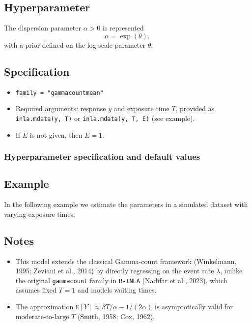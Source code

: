 \documentclass[a4paper,11pt]{article}
\begin{document}
\subsection*{Hyperparameter}

The dispersion parameter $\alpha > 0$ is represented
\begin{displaymath}
    \alpha = \exp(\theta),
\end{displaymath}
with a prior defined on the log-scale parameter $\theta$.

\subsection*{Specification}

\begin{itemize}
\item \texttt{family = "gammacountmean"}
\item Required arguments: response $y$ and exposure time $T$, provided as\\
    \texttt{inla.mdata(y, T)} or 
    \texttt{inla.mdata(y, T, E)} (see example).
\item If $E$ is not given, then $E=1$.
\end{itemize}

\subsubsection*{Hyperparameter specification and default values}


\subsection*{Example}

In the following example we estimate the parameters in a simulated
dataset with varying exposure times.


\subsection*{Notes}

\begin{itemize}
\item This model extends the classical Gamma-count framework
    (Winkelmann, 1995; Zeviani et al., 2014) by directly regressing on
    the event rate $\lambda$, unlike the original \texttt{gammacount}
    family in \texttt{R-INLA} (Nadifar et al., 2023), which assumes
    fixed $T=1$ and models waiting times.
\item The approximation
    ${\texttt E}[Y] \approx \beta T / \alpha - 1/(2\alpha)$ is
    asymptotically valid for moderate-to-large $T$ (Smith, 1958; Cox,
    1962).
\end{itemize}
\end{document}
